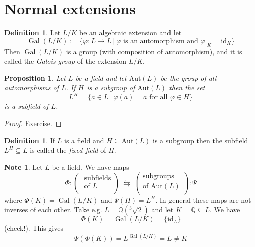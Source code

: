 \documentclass[12pt, letterpaper, oneside]{article}
\theoremstyle{plain}
\newtheorem{proposition}[theorem]{Proposition}
\theoremstyle{definition}
\newtheorem{definition}[theorem]{Definition}
\newtheorem{note}[theorem]{Note}
\newcommand{\Q}{{\mathbb Q}}
\newcommand{\Aut}{\mathrm{Aut}}
\newcommand{\id}{\mathrm{id}}
\newcommand{\Gal}{\operatorname{Gal}}
\newcommand{\vs}{\vskip 5mm}
\begin{document}


\newpage
\section{Normal extensions}
\label{SEC_NORMALEXT}


\begin{definition}
Let $L/K$ be an algebraic extension and let 
$$\Gal(L/K) := \{\varphi \colon L \to L \ | \ \varphi \text{ is an automorphism and } \varphi|_{K} = \id_{K}\}$$
Then $\Gal(L/K)$ is a group (with composition of automorphism), and it is called the 
\emph{Galois group} of the extension $L/K$. 
\end{definition}

\vs\vs


\begin{proposition}
Let $L$ be a field and let $\Aut(L)$ be the group of all automorphisms of $L$. 
If $H$ is a subgroup of $\Aut(L)$ then the set 
$$L^{H} = \{ a\in L \ | \ \varphi(a) = a \text{ for all } \varphi\in H \}$$
is a subfield of $L$. 
\end{proposition}

\vs

\begin{proof}
Exercise. 
\end{proof}


\vs\vs

\begin{definition}
If  $L$ is a field and  $H\subseteq \Aut(L)$ is a subgroup then the subfield $L^{H}\subseteq L$
is called the \emph{fixed field} of $H$. 
\end{definition}

\vs\vs

\begin{note}
Let $L$ be a field. We have maps
$$
\Phi\colon 
\begin{pmatrix}
\text{ subfields} \\[1mm]
\text{ of  $L$} \\
\end{pmatrix}
\ \leftrightarrows \ 
\begin{pmatrix}
\text{subgroups} \\[1mm]
\text{of $\Aut(L)$} \\
\end{pmatrix}
\colon \Psi
$$
where $\Phi(K) = \Gal(L/K)$ and $\Psi(H) = L^{H}$. In general these maps are not inverses 
of each other. Take e.g. $L = \Q(^{3}\!\!\!\sqrt{2})$ and let $K= \Q \subseteq L$. We have 
$$\Phi(K) = \Gal(L/K) = \{\id_{L}\}$$
(check!). This gives 
$$\Psi(\Phi(K)) = L^{\Gal(L/K)} = L \neq K$$
\end{note}
\end{document}
